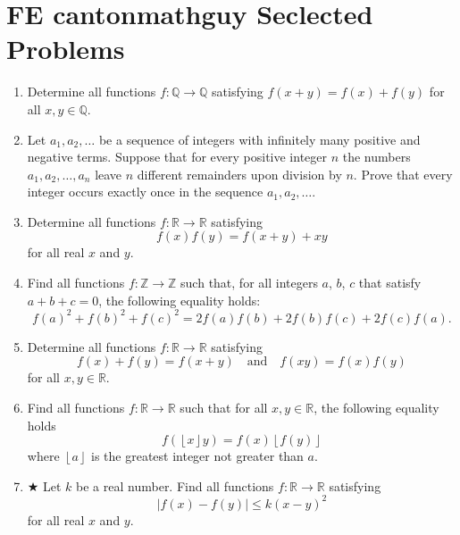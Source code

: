 \section{FE cantonmathguy Seclected Problems}



\begin{enumerate}

    


    \item Determine all functions $f: \mathbb{Q} \to \mathbb{Q}$ satisfying $f(x + y) = f(x) + f(y)$ for all $x, y \in \mathbb{Q}$.

    


    \item Let $a_1, a_2, \ldots$ be a sequence of integers with infinitely many positive and negative terms. Suppose that for every positive integer $n$ the numbers $a_1, a_2, \ldots, a_n$ leave $n$ different remainders upon division by $n$. Prove that every integer occurs exactly once in the sequence $a_1, a_2, \ldots$.

    


    \item Determine all functions $f: \mathbb{R} \to \mathbb{R}$ satisfying \[f(x)f(y) = f(x + y) + xy\]for all real $x$ and $y$.

    


    \item Find all functions $f: \mathbb{Z} \rightarrow \mathbb{Z}$ such that, for all integers $a$, $b$, $c$ that satisfy $a + b + c = 0$, the following equality holds:
    \[f(a)^2 + f(b)^2 + f(c)^2 = 2f(a)f(b) + 2f(b)f(c) + 2f(c)f(a).\]

    


    \item Determine all functions $f: \mathbb{R} \to \mathbb{R}$ satisfying
    \[f(x) + f(y) = f(x + y) \quad \text{and} \quad f(xy) = f(x)f(y)\]for all $x, y \in \mathbb{R}$.

    


    \item Find all functions $f: \mathbb{R} \rightarrow \mathbb{R}$ such that for all $x,y \in \mathbb{R}$, the following equality holds
    \[f(\left\lfloor x\right\rfloor y)=f(x)\left\lfloor f(y)\right\rfloor\]where $\left\lfloor a\right\rfloor$ is the greatest integer not greater than $a$.

    


    \item $ \bigstar $ Let $k$ be a real number. Find all functions $f: \mathbb{R} \to \mathbb{R}$ satisfying
    \[|f(x) - f(y)| \le k(x - y)^2\]for all real $x$ and $y$.


\end{enumerate}
